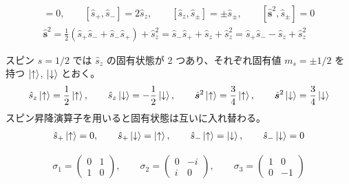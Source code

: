 \documentclass[uplatex,dvipdfmx,a4paper,11pt]{jlreq}
\theoremstyle{definition}
\begin{document}
\begin{proposition}
  \begin{align}
    [\hat{\bm{s}}^2, \hat{s}_z] = 0, \qquad [\hat{s}_+, \hat{s}_-] = 2\hat{s}_z, \qquad [\hat{s}_z, \hat{s}_\pm] = \pm \hat{s}_\pm, \qquad [\hat{\bm{s}}^2, \hat{s}_\pm] = 0 \\
    \hat{\bm{s}}^2 = \frac{1}{2}(\hat{s}_+\hat{s}_- + \hat{s}_-\hat{s}_+) + \hat{s}_z^2 = \hat{s}_-\hat{s}_+ + \hat{s}_z + \hat{s}_z^2 = \hat{s}_+\hat{s}_- - \hat{s}_z + \hat{s}_z^2
  \end{align}
\end{proposition}

\begin{proposition}
  スピン $s = 1/2$ では $\hat{s}_z$ の固有状態が 2 つあり、それぞれ固有値 $m_s = \pm1/2$ を持つ $\ket{\uparrow}$, $\ket{\downarrow}$ とおく。
  \begin{align}
    \hat{s}_z\ket{\uparrow} = \frac{1}{2}\ket{\uparrow}, \qquad \hat{s}_z\ket{\downarrow} = -\frac{1}{2}\ket{\downarrow}, \qquad \hat{\bm{s}}^2\ket{\uparrow} = \frac{3}{4}\ket{\uparrow}, \qquad \hat{\bm{s}}^2\ket{\downarrow} = \frac{3}{4}\ket{\downarrow}
  \end{align}
  スピン昇降演算子を用いると固有状態は互いに入れ替わる。
  \begin{align}
    \hat{s}_+\ket{\uparrow} = 0, \qquad \hat{s}_+\ket{\downarrow} = \ket{\uparrow}, \qquad \hat{s}_-\ket{\uparrow} = \ket{\downarrow}, \qquad \hat{s}_-\ket{\downarrow} = 0
  \end{align}
\end{proposition}

\begin{definition}[パウリ行列]
  \begin{align}
    \sigma_1 = \begin{pmatrix}
                 0 & 1 \\
                 1 & 0
               \end{pmatrix}, \qquad
    \sigma_2 = \begin{pmatrix}
                 0 & -i \\
                 i & 0
               \end{pmatrix}, \qquad
    \sigma_3 = \begin{pmatrix}
                 1 & 0  \\
                 0 & -1
               \end{pmatrix}
  \end{align}
\end{definition}
\end{document}
